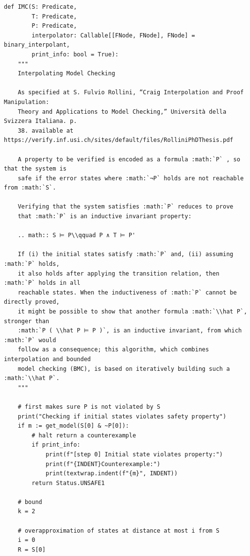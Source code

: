 \documentclass[11pt,a4paper]{report}%
\newenvironment{code}{\captionsetup{type=listing}}{}
\begin{document}
\begin{code}
\begin{verbatim}
def IMC(S: Predicate,
        T: Predicate,
        P: Predicate,
        interpolator: Callable[[FNode, FNode], FNode] = binary_interpolant,
        print_info: bool = True):
    """
    Interpolating Model Checking

    As specified at S. Fulvio Rollini, “Craig Interpolation and Proof Manipulation:
    Theory and Applications to Model Checking,” Università della Svizzera Italiana. p.
    38. available at https://verify.inf.usi.ch/sites/default/files/RolliniPhDThesis.pdf

    A property to be verified is encoded as a formula :math:`P` , so that the system is
    safe if the error states where :math:`¬P` holds are not reachable from :math:`S`.

    Verifying that the system satisfies :math:`P` reduces to prove
    that :math:`P` is an inductive invariant property:

    .. math:: S ⊨ P\\qquad P ∧ T ⊨ P'

    If (i) the initial states satisfy :math:`P` and, (ii) assuming :math:`P` holds,
    it also holds after applying the transition relation, then :math:`P` holds in all
    reachable states. When the inductiveness of :math:`P` cannot be directly proved,
    it might be possible to show that another formula :math:`\\hat P`, stronger than
    :math:`P ( \\hat P ⊨ P )`, is an inductive invariant, from which :math:`P` would
    follow as a consequence; this algorithm, which combines interpolation and bounded
    model checking (BMC), is based on iteratively building such a :math:`\\hat P`.
    """

    # first makes sure P is not violated by S
    print("Checking if initial states violates safety property")
    if m := get_model(S[0] & ~P[0]):
        # halt return a counterexample
        if print_info:
            print(f"[step 0] Initial state violates property:")
            print(f"{INDENT}Counterexample:")
            print(textwrap.indent(f"{m}", INDENT))
        return Status.UNSAFE1

    # bound
    k = 2

    # overapproximation of states at distance at most i from S
    i = 0
    R = S[0]


\end{verbatim}
\end{code}
\end{document}
